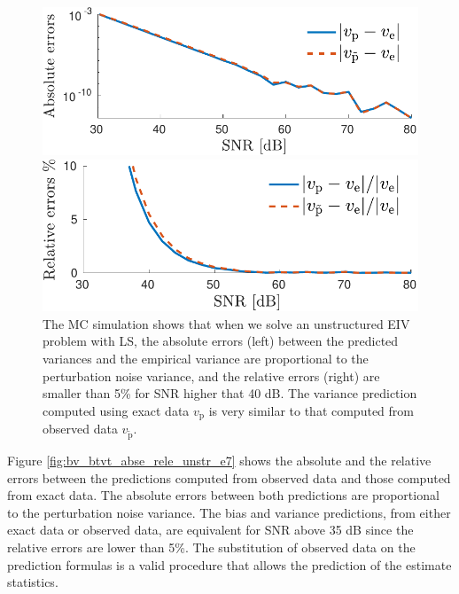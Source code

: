 \begin{figure}[htb!]
    \centering
    \begin{minipage}{0.45\textwidth}
        \centering
        \includegraphics[width=1\textwidth]{./ChapterStatisticalAnalysis/fig/Fig_3l.pdf} 
    \end{minipage}
    \begin{minipage}{0.45\textwidth}
        \centering
        \includegraphics[width=1\textwidth]{./ChapterStatisticalAnalysis/fig/Fig_3r.pdf} 
    \end{minipage}
  \caption{ \label{fig:v_vt_abse_rele_unstr_e7} The MC simulation shows that when we solve an unstructured EIV problem with LS, the absolute errors (left) between the predicted variances and the empirical variance are proportional to the perturbation noise variance, and the relative errors (right) are smaller than 5\% for SNR higher that 40 dB. The variance prediction computed using exact data ${v}_\mathrm{p}$ is very similar to that computed from observed data $v_{\widetilde{\mathrm{p}}}$. } 
\end{figure}

Figure \ref{fig:bv_btvt_abse_rele_unstr_e7} shows the absolute and the relative errors between the predictions computed from observed data and those computed from exact data.
The absolute errors between both predictions are proportional to the perturbation noise variance.
The bias and variance predictions, from either exact data or observed data, are equivalent for SNR above 35 dB since the relative errors are lower than 5\%.
The substitution of observed data on the prediction formulas is a valid procedure that allows the prediction of the estimate statistics.

